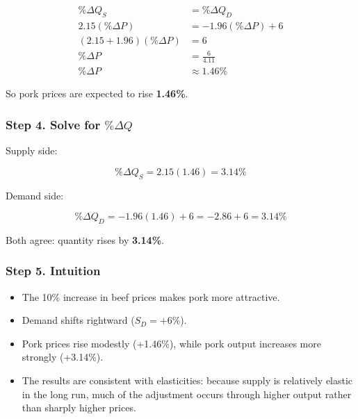 \documentclass[
  letterpaper,
  DIV=11,
  numbers=noendperiod]{scrartcl}
\providecommand{\tightlist}{%
  \setlength{\itemsep}{0pt}\setlength{\parskip}{0pt}}
\begin{document}
\[
\begin{aligned}
\% \Delta Q_S &= \% \Delta Q_D \\
2.15 (\% \Delta P) &= -1.96 (\% \Delta P) + 6 \\
(2.15 + 1.96)(\% \Delta P) &= 6 \\
\% \Delta P &= \frac{6}{4.11} \\
\% \Delta P &\approx 1.46 \%
\end{aligned}
\]

So pork prices are expected to rise \textbf{1.46\%}.

\subsubsection{\texorpdfstring{Step 4. Solve for
\(\% \Delta Q\)}{Step 4. Solve for \textbackslash\% \textbackslash Delta Q}}\label{step-4.-solve-for-delta-q}

Supply side:

\[
\% \Delta Q_S = 2.15 (1.46) = 3.14 \%
\]

Demand side:

\[
\% \Delta Q_D = -1.96(1.46) + 6 = -2.86 + 6 = 3.14 \%
\]

Both agree: quantity rises by \textbf{3.14\%}.

\subsubsection{Step 5. Intuition}\label{step-5.-intuition}

\begin{itemize}
\tightlist
\item
  The 10\% increase in beef prices makes pork more attractive.\\
\item
  Demand shifts rightward (\(S_D = +6\%\)).\\
\item
  Pork prices rise modestly (+1.46\%), while pork output increases more
  strongly (+3.14\%).\\
\item
  The results are consistent with elasticities: because supply is
  relatively elastic in the long run, much of the adjustment occurs
  through higher output rather than sharply higher prices.
\end{itemize}
\end{document}
